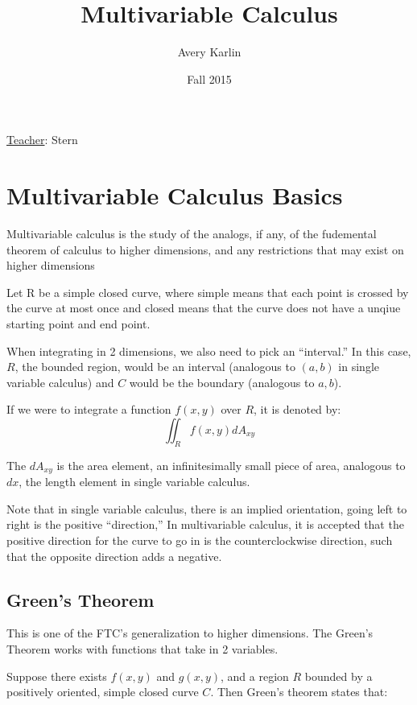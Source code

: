 \documentclass[11 pt, twoside]{article}
\begin{document}
\title{Multivariable Calculus}
\author{Avery Karlin}
\date{Fall 2015}

\maketitle
\newpage
\tableofcontents
\vspace{11pt}
\noindent
\underline{Teacher}: Stern
\newpage

\section{Multivariable Calculus Basics}

Multivariable calculus is the study of the analogs, if any, of the fudemental theorem of calculus to higher dimensions, and any restrictions that may exist on higher dimensions

Let R be a simple closed curve, where simple means that each point is crossed by the curve at most once and closed means that the curve does not have a unqiue starting point and
end point.

When integrating in 2 dimensions, we also need to pick an ``interval.'' In this
case, $R$, the bounded region, would be an interval (analogous to $(a,b)$ in
single variable calculus) and $C$ would be the boundary (analogous to $a, b$).

If we were to integrate a function $f(x,y)$ over $R$, it is denoted by:
$$\iint_R f(x,y) dA_{xy}$$

The $dA_{xy}$ is the area element, an infinitesimally small piece of area,  analogous to $dx$, the length element in single variable calculus.

Note that in single variable calculus, there is an implied orientation, going
left to right is the positive ``direction,'' In multivariable calculus, it is
accepted that the positive direction for the curve to go in is the counterclockwise direction, such that the opposite direction adds a negative.

\subsection{Green's Theorem}

This is one of the FTC's generalization to higher dimensions. The Green's
Theorem works with functions that take in 2 variables.

Suppose there exists $f(x, y)$ and $g(x, y)$, and a region $R$ bounded by a
positively oriented, simple closed curve $C$. Then Green's theorem states that:
\end{document}
